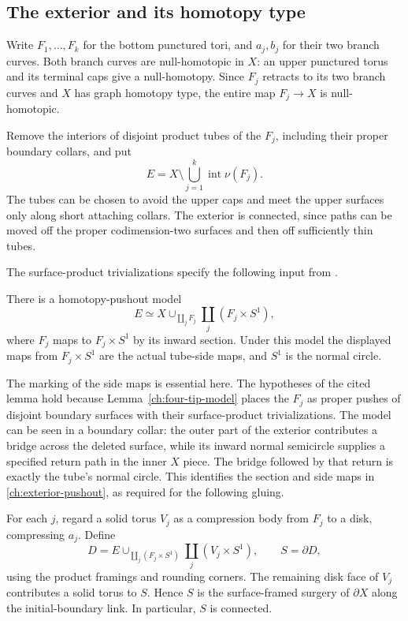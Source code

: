 \subsection{The exterior and its homotopy type}

Write $F_1,\ldots,F_k$ for the bottom punctured tori, and $a_j,b_j$
for their two branch curves.  Both branch curves are null-homotopic
in $X$: an upper punctured torus and its terminal caps give a
null-homotopy.  Since $F_j$ retracts to its two branch curves and
$X$ has graph homotopy type, the entire map $F_j\to X$ is
null-homotopic.

Remove the interiors of disjoint product tubes of the $F_j$, including
their proper boundary collars, and put
\[
 E=X\setminus\bigcup_{j=1}^k\operatorname{int}\nu(F_j).
\]
The tubes can be chosen to avoid the upper caps and meet the upper
surfaces only along short attaching collars.  The exterior is
connected, since paths can be moved off the proper codimension-two
surfaces and then off sufficiently thin tubes.

The surface-product trivializations specify the following input from
\cite[Lemma~2.2]{PD}.

\begin{lemma}
\label{ch:exterior-model}
There is a homotopy-pushout model
\begin{equation}
\label{ch:exterior-pushout}
 E\simeq X\cup_{\coprod_jF_j}\coprod_j(F_j\times S^1),
\end{equation}
where $F_j$ maps to $F_j\times S^1$ by its inward section.  Under
this model the displayed maps from $F_j\times S^1$ are the actual
tube-side maps, and $S^1$ is the normal circle.
\end{lemma}

The marking of the side maps is essential here.  The hypotheses of
the cited lemma hold because Lemma~\ref{ch:four-tip-model} places
the $F_j$ as proper pushes of disjoint boundary surfaces with their
surface-product trivializations.  The model can be seen in a boundary
collar: the outer part of the exterior contributes a bridge across
the deleted surface, while its inward normal semicircle supplies a
specified return path in the inner $X$ piece.  The bridge followed
by that return is exactly the tube's normal circle.  This identifies
the section and side maps in \eqref{ch:exterior-pushout}, as required
for the following gluing.

For each $j$, regard a solid torus $V_j$ as a compression body from
$F_j$ to a disk, compressing $a_j$.  Define
\begin{equation}
\label{ch:chamber-definition}
 D=E\cup_{\coprod_j(F_j\times S^1)}
             \coprod_j(V_j\times S^1),\qquad S=\partial D,
\end{equation}
using the product framings and rounding corners.  The remaining disk
face of $V_j$ contributes a solid torus to $S$.  Hence $S$ is the
surface-framed surgery of $\partial X$ along the initial-boundary
link.  In particular, $S$ is connected.

